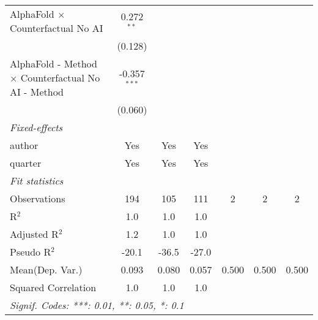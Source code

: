 \begin{tabular}{lcccccc}
   AlphaFold $\times$ Counterfactual No AI                    & 0.272$^{**}$   &               &               &     &     &   \\   
                                                              & (0.128)        &               &               &     &     &   \\   
   AlphaFold - Method $\times$ Counterfactual No AI - Method  & -0.357$^{***}$ &               &               &     &     &   \\   
                                                              & (0.060)        &               &               &     &     &   \\   
   \midrule
   \emph{Fixed-effects}\\
   author                                                     & Yes            & Yes           & Yes           &     &     & \\  
   quarter                                                    & Yes            & Yes           & Yes           &     &     & \\  
   \midrule
   \emph{Fit statistics}\\
   Observations                                               & 194            & 105           & 111           & 2   & 2   & 2\\  
   R$^2$                                                      & 1.0            & 1.0           & 1.0           &     &     & \\  
   Adjusted R$^2$                                             & 1.2            & 1.0           & 1.0           &     &     & \\  
   Pseudo R$^2$                                               & -20.1          & -36.5         & -27.0         &     &     & \\  
Mean(Dep. Var.) & 0.093 & 0.080 & 0.057 & 0.500 & 0.500 & 0.500 \\
   Squared Correlation                                        & 1.0            & 1.0           & 1.0           &     &     & \\  
   \midrule \midrule
   \multicolumn{7}{l}{\emph{Signif. Codes: ***: 0.01, **: 0.05, *: 0.1}}\\
\end{tabular}
\par\endgroup
